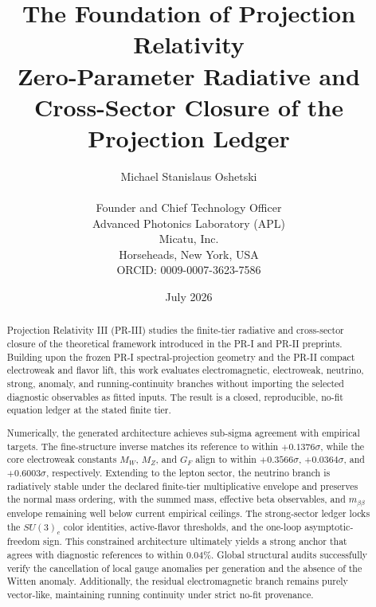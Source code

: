 \documentclass[11pt]{article}
\title{The Foundation of Projection Relativity \uppercase\expandafter{\romannumeral3}\\
\Large Zero-Parameter Radiative and Cross-Sector Closure of the Projection Ledger}
\author{Michael Stanislaus Oshetski \orcidlink{0009-0007-3623-7586} \\
\small \email{michael.oshetski@micatu.com}\\
\small Founder and Chief Technology Officer \\
\small Advanced Photonics Laboratory (APL)\\
\small Micatu, Inc. \\
\small Horseheads, New York, USA \\
\small ORCID: 0009-0007-3623-7586
\date {July 2026}}
\begin{document}
\maketitle

\begin{abstract}
Projection Relativity III (PR-III) studies the finite-tier radiative and cross-sector closure of the theoretical framework introduced in the PR-I and PR-II preprints. Building upon the frozen PR-I spectral-projection geometry and the PR-II compact electroweak and flavor lift, this work evaluates electromagnetic, electroweak, neutrino, strong, anomaly, and running-continuity branches without importing the selected diagnostic observables as fitted inputs. The result is a closed, reproducible, no-fit equation ledger at the stated finite tier.

Numerically, the generated architecture achieves sub-sigma agreement with empirical targets. The fine-structure inverse matches its reference to within $+0.1376\sigma$, while the core electroweak constants $M_W$, $M_Z$, and $G_F$ align to within $+0.3566\sigma$, $+0.0364\sigma$, and $+0.6003\sigma$, respectively. Extending to the lepton sector, the neutrino branch is radiatively stable under the declared finite-tier multiplicative envelope and preserves the normal mass ordering, with the summed mass, effective beta observables, and $m_{\beta\beta}$ envelope remaining well below current empirical ceilings. The strong-sector ledger locks the $SU(3)_c$ color identities, active-flavor thresholds, and the one-loop asymptotic-freedom sign. This constrained architecture ultimately yields a strong anchor that agrees with diagnostic references to within $0.04\%$. Global structural audits successfully verify the cancellation of local gauge anomalies per generation and the absence of the Witten anomaly. Additionally, the residual electromagnetic branch remains purely vector-like, maintaining running continuity under strict no-fit provenance.


\end{abstract}
\end{document}
